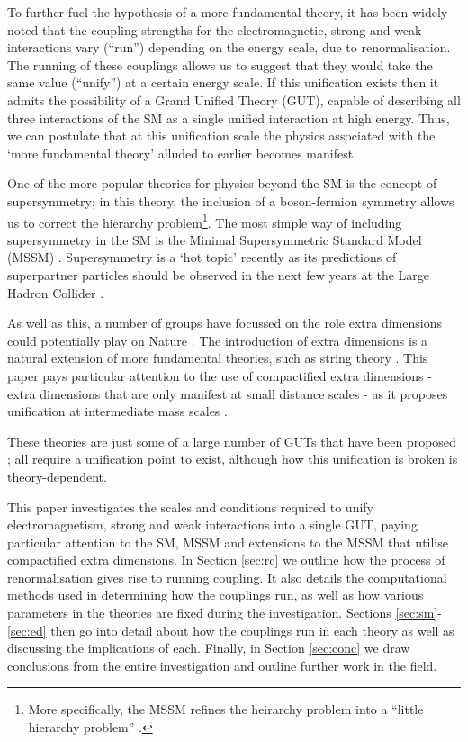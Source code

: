 \documentclass[12pt,a4paper,oneside]{article}
\begin{document}
To further fuel the hypothesis of a more fundamental theory, it has been widely noted \cite{amaldi, running-2} that the coupling strengths for the electromagnetic, strong and weak interactions vary (``run'') depending on the energy scale, due to renormalisation. The running of these couplings allows us to suggest that they would take the same value (``unify'') at a certain energy scale. If this unification exists then it admits the possibility of a Grand Unified Theory (GUT), capable of describing all three interactions of the SM as a single unified interaction at high energy. Thus, we can postulate that at this unification scale the physics associated with the `more fundamental theory' alluded to earlier becomes manifest.

One of the more popular theories for physics beyond the SM is the concept of supersymmetry; in this theory, the inclusion of a boson-fermion symmetry allows us to correct the hierarchy problem\footnote{More specifically, the MSSM refines the heirarchy problem into a ``little hierarchy problem'' \cite{lhp}.}. The most simple way of including supersymmetry in the SM is the Minimal Supersymmetric Standard Model (MSSM) \cite{mssm}. Supersymmetry is a `hot topic' recently as its predictions of superpartner particles should be observed in the next few years at the Large Hadron Collider \cite{mssm-lhc}.

As well as this, a number of groups have focussed on the role extra dimensions could potentially play on Nature \cite{ed-1, ed-2}. The introduction of extra dimensions is a natural extension of more fundamental theories, such as string theory \cite{string}. This paper pays particular attention to the use of compactified extra dimensions - extra dimensions that are only manifest at small distance scales - as it proposes unification at intermediate mass scales \cite{gherghetta}.

These theories are just some of a large number of GUTs that have been proposed \cite{pdg}; all require a unification point to exist, although how this unification is broken is theory-dependent.

This paper investigates the scales and conditions required to unify electromagnetism, strong and weak interactions into a single GUT, paying particular attention to the SM, MSSM and extensions to the MSSM that utilise compactified extra dimensions. In Section \ref{sec:rc} we outline how the process of renormalisation gives rise to running coupling. It also details the computational methods used in determining how the couplings run, as well as how various parameters in the theories are fixed during the investigation. Sections \ref{sec:sm}-\ref{sec:ed} then go into detail about how the couplings run in each theory as well as discussing the implications of each. Finally, in Section \ref{sec:conc} we draw conclusions from the entire investigation and outline further work in the field.
\end{document}

